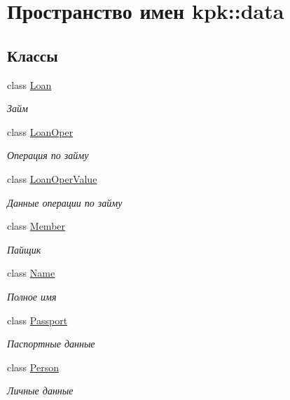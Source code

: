 \hypertarget{namespacekpk_1_1data}{}\section{Пространство имен kpk\+:\+:data}
\label{namespacekpk_1_1data}
\subsection*{Классы}
\begin{DoxyCompactItemize}
\item 
class \hyperlink{classkpk_1_1data_1_1_loan}{Loan}
\begin{DoxyCompactList}\small\item\em Займ \end{DoxyCompactList}\item 
class \hyperlink{classkpk_1_1data_1_1_loan_oper}{Loan\+Oper}
\begin{DoxyCompactList}\small\item\em Операция по займу \end{DoxyCompactList}\item 
class \hyperlink{classkpk_1_1data_1_1_loan_oper_value}{Loan\+Oper\+Value}
\begin{DoxyCompactList}\small\item\em Данные операции по займу \end{DoxyCompactList}\item 
class \hyperlink{classkpk_1_1data_1_1_member}{Member}
\begin{DoxyCompactList}\small\item\em Пайщик \end{DoxyCompactList}\item 
class \hyperlink{classkpk_1_1data_1_1_name}{Name}
\begin{DoxyCompactList}\small\item\em Полное имя \end{DoxyCompactList}\item 
class \hyperlink{classkpk_1_1data_1_1_passport}{Passport}
\begin{DoxyCompactList}\small\item\em Паспортные данные \end{DoxyCompactList}\item 
class \hyperlink{classkpk_1_1data_1_1_person}{Person}
\begin{DoxyCompactList}\small\item\em Личные данные \end{DoxyCompactList}\end{DoxyCompactItemize}
